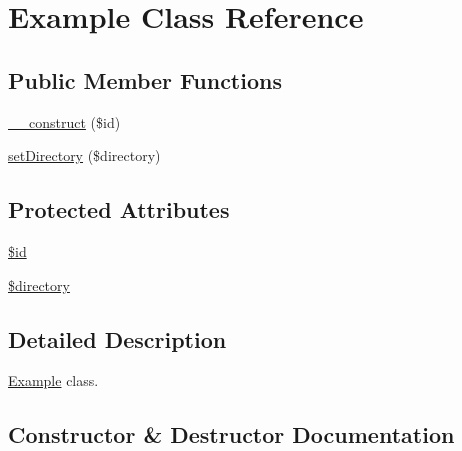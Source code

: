 \hypertarget{classorg_1_1bovigo_1_1vfs_1_1example_1_1_example}{}\section{Example Class Reference}
\label{classorg_1_1bovigo_1_1vfs_1_1example_1_1_example}
\subsection*{Public Member Functions}
\begin{DoxyCompactItemize}
\item 
\mbox{\hyperlink{classorg_1_1bovigo_1_1vfs_1_1example_1_1_example_a1340871f436b81e1f225567b6cce4e79}{\+\_\+\+\_\+construct}} (\$id)
\item 
\mbox{\hyperlink{classorg_1_1bovigo_1_1vfs_1_1example_1_1_example_a5eae0fee10825181e49c92c86fa71fbc}{set\+Directory}} (\$directory)
\end{DoxyCompactItemize}
\subsection*{Protected Attributes}
\begin{DoxyCompactItemize}
\item 
\mbox{\hyperlink{classorg_1_1bovigo_1_1vfs_1_1example_1_1_example_ae97941710d863131c700f069b109991e}{\$id}}
\item 
\mbox{\hyperlink{classorg_1_1bovigo_1_1vfs_1_1example_1_1_example_a1b07c630eb02f770a082a013373a16d6}{\$directory}}
\end{DoxyCompactItemize}


\subsection{Detailed Description}
\mbox{\hyperlink{classorg_1_1bovigo_1_1vfs_1_1example_1_1_example}{Example}} class. 

\subsection{Constructor \& Destructor Documentation}
\mbox{\label{classorg_1_1bovigo_1_1vfs_1_1example_1_1_example_a1340871f436b81e1f225567b6cce4e79}} 

